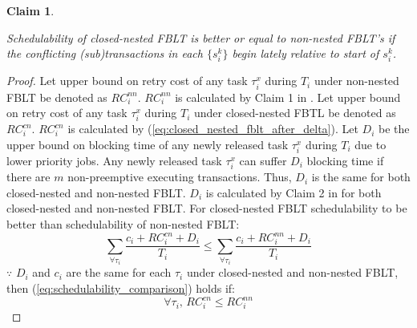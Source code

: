 \documentclass[preprint]{sigplanconf}
\newtheorem{clm}{Claim}
\begin{document}
\begin{clm}\label{clm:closed_nested_non_nested_fblt_schedulabiltiy_comp}

Schedulability of closed-nested FBLT is better or equal to non-nested
FBLT's if the conflicting (sub)transactions in each $\{s_{i}^{k}\}$
begin lately relative to start of $s_{i}^{k}$.

\end{clm}
%
\begin{proof}

Let upper bound on retry cost of any task $\tau_{i}^{x}$ during $T_{i}$
under non-nested FBLT be denoted as $RC_{i}^{nn}$. $RC_{i}^{nn}$
is calculated by Claim 1 in \cite{fblt}. Let upper bound on retry
cost of any task $\tau_{i}^{x}$ during $T_{i}$ under closed-nested
FBTL be denoted as $RC_{i}^{cn}$. $RC_{i}^{cn}$ is calculated by
(\ref{eq:closed_nested_fblt_after_delta}). Let $D_{i}$ be the upper
bound on blocking time of any newly released task $\tau_{i}^{x}$
during $T_{i}$ due to lower priority jobs. Any newly released task
$\tau_{i}^{x}$ can suffer $D_{i}$ blocking time if there are $m$
non-preemptive executing transactions. Thus, $D_{i}$ is the same
for both closed-nested and non-nested FBLT. $D_{i}$ is calculated
by Claim 2 in \cite{fblt} for both closed-nested and non-nested FBLT.
For closed-nested FBLT schedulability to be better than schedulability
of non-nested FBLT: 
\begin{equation}
\sum_{\forall\tau_{i}}\frac{c_{i}+RC_{i}^{cn}+D_{i}}{T_{i}}\le\sum_{\forall\tau_{i}}\frac{c_{i}+RC_{i}^{nn}+D_{i}}{T_{i}}\label{eq:schedulability_comparison}
\end{equation}
$\because$ $D_{i}$ and $c_{i}$ are the same for each $\tau_{i}$
under closed-nested and non-nested FBLT, then (\ref{eq:schedulability_comparison})
holds if:
\[
\forall\tau_{i},\, RC_{i}^{cn}\le RC_{i}^{nn}
\]



\end{proof}
\end{document}
